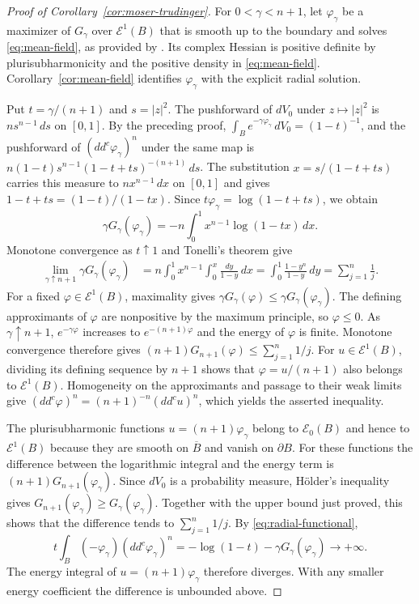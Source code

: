 \documentclass[11pt]{article}
\begin{document}
\begin{proof}[Proof of Corollary~\ref{cor:moser-trudinger}]
For $0<\gamma<n+1$, let $\varphi_\gamma$ be a maximizer of $G_\gamma$
over $\mathcal E^1(B)$ that is smooth up to the boundary and solves
\eqref{eq:mean-field}, as provided by \cite[Theorem~7.2 and Remark~7.3]{BB2022}.
Its complex Hessian is positive definite by plurisubharmonicity and
the positive density in \eqref{eq:mean-field}. Corollary~\ref{cor:mean-field}
identifies $\varphi_\gamma$ with the explicit radial solution.

Put $t=\gamma/(n+1)$ and $s=|z|^2$. The pushforward of $dV_0$
under $z\mapsto |z|^2$ is $ns^{n-1}\,ds$ on $[0,1]$.
By the preceding proof, $\int_B e^{-\gamma\varphi_\gamma}\,dV_0=(1-t)^{-1}$,
and the pushforward of $(dd^c\varphi_\gamma)^n$ under the same map is
$n(1-t)s^{n-1}(1-t+ts)^{-(n+1)}\,ds$. The substitution
$x=s/(1-t+ts)$ carries this measure to $n x^{n-1}\,dx$ on $[0,1]$
and gives $1-t+ts=(1-t)/(1-tx)$. Since
$t\varphi_\gamma=\log(1-t+ts)$, we obtain
\begin{equation}\label{eq:radial-functional}
 \gamma G_\gamma(\varphi_\gamma)
 =-n\int_0^1 x^{n-1}\log(1-tx)\,dx.
\end{equation}
Monotone convergence as $t\uparrow1$ and Tonelli's theorem give
\begin{align*}
 \lim_{\gamma\uparrow n+1}\gamma G_\gamma(\varphi_\gamma)
 &= n\int_0^1 x^{n-1}\int_0^x\frac{dy}{1-y}\,dx = \int_0^1\frac{1-y^n}{1-y}\,dy
  = \sum_{j=1}^n\frac1j.
\end{align*}
For a fixed $\varphi\in\mathcal E^1(B)$, maximality gives
$\gamma G_\gamma(\varphi)\le\gamma G_\gamma(\varphi_\gamma)$.
The defining approximants of $\varphi$ are nonpositive by the maximum
principle, so $\varphi\le0$. As $\gamma\uparrow n+1$,
$e^{-\gamma\varphi}$ increases to $e^{-(n+1)\varphi}$ and the energy
of $\varphi$ is finite. Monotone convergence therefore gives
$(n+1)G_{n+1}(\varphi)\le\sum_{j=1}^n1/j$.
For $u\in\mathcal E^1(B)$, dividing its defining sequence
by $n+1$ shows that $\varphi=u/(n+1)$ also belongs to $\mathcal E^1(B)$.
Homogeneity on the approximants and passage to their weak limits give
$(dd^c\varphi)^n=(n+1)^{-n}(dd^cu)^n$, which yields the asserted inequality.

The plurisubharmonic functions $u=(n+1)\varphi_\gamma$ belong to
$\mathcal E_0(B)$ and hence to $\mathcal E^1(B)$ because they are
smooth on $\overline B$ and vanish on $\partial B$.
For these functions the difference between
the logarithmic integral and the energy term is
$(n+1)G_{n+1}(\varphi_\gamma)$. Since $dV_0$ is a probability measure,
H\"older's inequality gives $G_{n+1}(\varphi_\gamma)\ge G_\gamma(\varphi_\gamma)$.
Together with the upper bound just proved, this shows that the
difference tends to $\sum_{j=1}^n 1/j$.
By \eqref{eq:radial-functional},
$$
 t\int_B(-\varphi_\gamma)(dd^c\varphi_\gamma)^n
 =-\log(1-t)-\gamma G_\gamma(\varphi_\gamma)\longrightarrow+\infty.
$$
The energy integral of $u=(n+1)\varphi_\gamma$ therefore diverges.
With any smaller energy coefficient the difference is unbounded above.
\end{proof}
\end{document}
